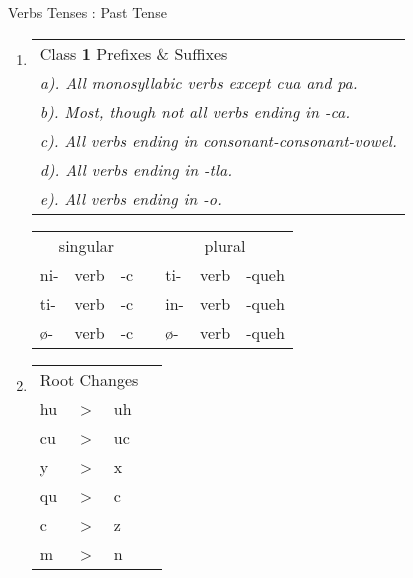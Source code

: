 \documentclass[12pt]{beamer}
\newcommand{\nah}[1]{\textcolor{nahgrn}{#1}}
\newcommand{\trs}[1]{\textcolor{nahblu}{#1}}
\begin{document}
\begin{frame}
\begin{columns}[t]
\begin{column}{.26\linewidth}
\begin{block}{Verbs Tenses : Past Tense}
\begin{enumerate}
    			\item \begin{tabular}[t]{l} %
    				Class \textbf{1} \nah{Prefixes} \& \trs{Suffixes}			\\
    				\textit{a). All monosyllabic verbs except cua and pa.} 		\\
    				\textit{b). Most, though not all verbs ending in -ca.} 		\\
    				\textit{c). All verbs ending in consonant-consonant-vowel.} \\
    				\textit{d). All verbs ending in -tla.} 						\\
    				\textit{e). All verbs ending in -o.}						\\
    			\end{tabular}
    			\begin{tabular}[t]{lllllll}
    				\multicolumn{3}{c}{singular}    & \vline & \multicolumn{3}{c}{plural}        \\
    				\cline{1-7}
    				\nah{ni-}   & verb & \trs{-c}   & \vline & \nah{ti-}   & verb & \trs{-queh}  \\
    				\nah{ti-}   & verb & \trs{-c}   & \vline & \nah{in-}   & verb & \trs{-queh}  \\
    				\nah{ø-}    & verb & \trs{-c}   & \vline & \nah{ø-}    & verb & \trs{-queh}  \\
    			\end{tabular}
    			\item \text{Class \textbf{2} \nah{Prefixes} \& \trs{Suffixes}} \newline
    			\newline
    			\begin{tabular}[t]{llll}
    				\multicolumn{3}{c}{Root Changes} & \vline \\
    				\cline{1-3}
    				hu	& > & uh & \vline	\\
    				cu	& > & uc & \vline	\\
    				y	& > & x	 & \vline	\\
    				qu	& > & c	 & \vline 	\\
    				c	& > & z	 & \vline 	\\
    				m	& > & n	 & \vline 	\\

\end{tabular}
\end{enumerate}
\end{block}
\end{column}
\end{columns}
\end{frame}
\end{document}
